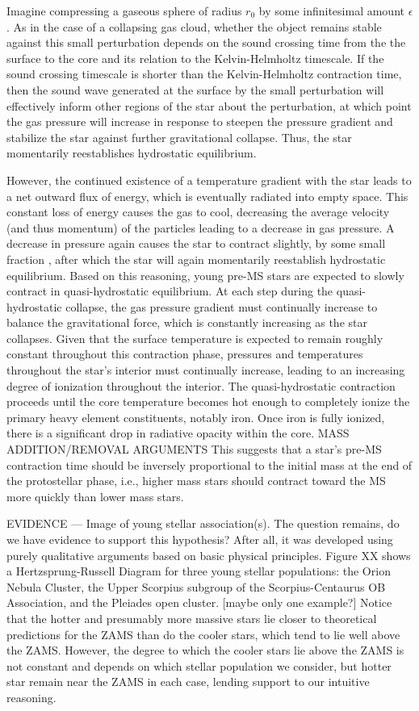 Imagine compressing a gaseous sphere of radius $r_0$ by some infinitesimal amount $\epsilon$. As in the case of a collapsing gas cloud, whether the object remains stable against this small perturbation depends on the sound crossing time from the the surface to the core and its relation to the Kelvin-Helmholtz timescale. If the sound crossing timescale is shorter than the Kelvin-Helmholtz contraction time, then the sound wave generated at the surface by the small perturbation will effectively inform other regions of the star about the perturbation, at which point the gas pressure will increase in response to steepen the pressure gradient and stabilize the star against further gravitational collapse. Thus, the star momentarily reestablishes hydrostatic equilibrium. 

However, the continued existence of a temperature gradient with the star leads to a net outward flux of energy, which is eventually radiated into empty space. This constant loss of energy causes the gas to cool, decreasing the average velocity (and thus momentum) of the particles leading to a decrease in gas pressure. A decrease in pressure again causes the star to contract slightly, by some small fraction ​, after which the star will again momentarily reestablish hydrostatic equilibrium. Based on this reasoning, young pre-MS stars are expected to slowly contract in quasi-hydrostatic equilibrium.
At each step during the quasi-hydrostatic collapse, the gas pressure gradient must continually increase to balance the gravitational force, which is constantly increasing as the star collapses. Given that the surface temperature is expected to remain roughly constant throughout this contraction phase, pressures and temperatures throughout the star's interior must continually increase, leading to an increasing degree of ionization throughout the interior. The quasi-hydrostatic contraction proceeds until the core temperature becomes hot enough to completely ionize the primary heavy element constituents, notably iron. Once iron is fully ionized, there is a significant drop in radiative opacity within the core. 
MASS ADDITION/REMOVAL ARGUMENTS
This suggests that a star's pre-MS contraction time should be inversely proportional to the initial mass at the end of the protostellar phase, i.e., higher mass stars should contract toward the MS more quickly than lower mass stars. 

EVIDENCE --- Image of young stellar association(s).
The question remains, do we have evidence to support this hypothesis? After all, it was developed using purely qualitative arguments based on basic physical principles. Figure XX shows a Hertzsprung-Russell Diagram for three young stellar populations: the Orion Nebula Cluster, the Upper Scorpius subgroup of the Scorpius-Centaurus OB Association, and the Pleiades open cluster. [maybe only one example?] Notice that the hotter and presumably more massive stars lie closer to theoretical predictions for the ZAMS than do the cooler stars, which tend to lie well above the ZAMS. However, the degree to which the cooler stars lie above the ZAMS is not constant and depends on which stellar population we consider, but hotter star remain near the ZAMS in each case, lending support to our intuitive reasoning.